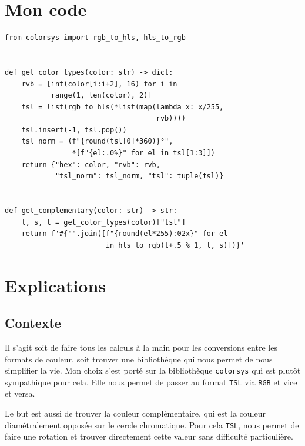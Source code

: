 \section{Mon code}
\begin{lstlisting}
from colorsys import rgb_to_hls, hls_to_rgb


def get_color_types(color: str) -> dict:
    rvb = [int(color[i:i+2], 16) for i in
           range(1, len(color), 2)]
    tsl = list(rgb_to_hls(*list(map(lambda x: x/255,
                                    rvb))))
    tsl.insert(-1, tsl.pop())
    tsl_norm = (f"{round(tsl[0]*360)}°",
                *[f"{el:.0%}" for el in tsl[1:3]])
    return {"hex": color, "rvb": rvb,
            "tsl_norm": tsl_norm, "tsl": tuple(tsl)}


def get_complementary(color: str) -> str:
    t, s, l = get_color_types(color)["tsl"]
    return f'#{"".join([f"{round(el*255):02x}" for el 
                        in hls_to_rgb(t+.5 % 1, l, s)])}'
\end{lstlisting}
\medskip

\section{Explications}
\subsection*{Contexte}
Il s'agit soit de faire tous les calculs à la main pour les conversions entre les formats de couleur, soit trouver une bibliothèque qui nous permet de nous simplifier la vie. Mon choix s'est porté sur la bibliothèque \texttt{colorsys} qui est plutôt sympathique pour cela. Elle nous permet de passer au format \texttt{TSL} via \texttt{RGB} et vice et versa.
\medskip

Le but est aussi de trouver la couleur complémentaire, qui est la couleur diamétralement opposée sur le cercle chromatique. Pour cela \texttt{TSL}, nous permet de faire une rotation et trouver directement cette valeur sans difficulté particulière.
\medskip

